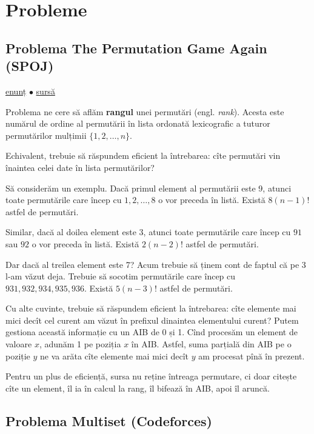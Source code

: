 \section{Probleme}

\subsection{Problema The Permutation Game Again (SPOJ)}
\label{problem:the-permutation-game-again}

\href{https://www.spoj.com/problems/TPGA/}{enunț}
$\bullet$
\hyperref[code:the-permutation-game-again]{sursă}

Problema ne cere să aflăm \textbf{rangul} unei permutări (engl. \textit{rank}). Acesta este numărul de ordine al permutării în lista ordonată lexicografic a tuturor permutărilor mulțimii $\{1, 2, \dots, n\}$.

Echivalent, trebuie să răspundem eficient la întrebarea: cîte permutări vin înaintea celei date în lista permutărilor?

Să considerăm un exemplu. Dacă primul element al permutării este 9, atunci toate permutările care încep cu $1, 2, \dots, 8$ o vor preceda în listă. Există $8(n-1)!$ astfel de permutări.

Similar, dacă al doilea element este 3, atunci toate permutările care încep cu $91$ sau $92$ o vor preceda în listă. Există $2(n-2)!$ astfel de permutări.

Dar dacă al treilea element este 7? Acum trebuie să ținem cont de faptul că pe 3 l-am văzut deja. Trebuie să socotim permutările care încep cu $931, 932, 934, 935, 936$. Există $5(n-3)!$ astfel de permutări.

Cu alte cuvinte, trebuie să răspundem eficient la întrebarea: cîte elemente mai mici decît cel curent am văzut în prefixul dinaintea elementului curent? Putem gestiona această informație cu un AIB de 0 și 1. Cînd procesăm un element de valoare $x$, adunăm 1 pe poziția $x$ în AIB. Astfel, suma parțială din AIB pe o poziție $y$ ne va arăta cîte elemente mai mici decît $y$ am procesat pînă în prezent.

Pentru un plus de eficiență, sursa nu reține întreaga permutare, ci doar citește cîte un element, îl ia în calcul la rang, îl bifează în AIB, apoi îl aruncă.

\subsection{Problema Multiset (Codeforces)}
\label{problem:multiset}

